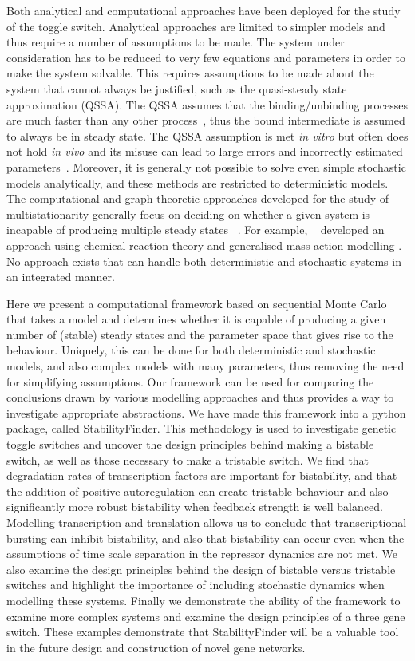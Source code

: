 Both analytical and computational approaches have been deployed for the study of the toggle switch. Analytical approaches are limited to simpler models and thus require a number of assumptions to be made. The system under consideration has to be reduced to very few equations and parameters in order to make the system solvable. This requires assumptions to be made about the system that cannot always be justified, such as the quasi-steady state approximation (QSSA). The QSSA assumes that the binding/unbinding processes are much faster than any other process~\autocite{Loinger:2007vma}, thus the bound intermediate is assumed to always be in steady state. The QSSA assumption is met \textit{in vitro} but often does not hold \textit{in vivo} and its misuse can lead to large errors and incorrectly estimated parameters~\autocite{Pedersen:2007ke}. Moreover, it is generally not possible to solve even simple stochastic models analytically, and these methods are restricted to deterministic models. The computational and graph-theoretic approaches developed for the study of multistationarity generally focus on deciding on whether a given system is incapable of producing multiple steady states ~\autocite{Conradi:2007jo, Banaji:2010fh,Feliu:2013dz}. For example, ~\textcite{Feliu:2013dz} developed an approach using chemical reaction theory and generalised mass action modelling \autocite{Feliu:2013dz}. No approach exists that can handle both deterministic and stochastic systems in an integrated manner.
\par
Here we present a computational framework based on sequential Monte Carlo that takes a model and determines whether it is capable of producing a given number of (stable) steady states and the parameter space that gives rise to the behaviour. Uniquely, this can be done for both deterministic and stochastic models, and also complex models with many parameters, thus removing the need for simplifying assumptions. Our framework can be used for comparing the conclusions drawn by various modelling approaches and thus provides a way to investigate appropriate abstractions. We have made this framework into a python package, called StabilityFinder. This methodology is used to investigate genetic toggle switches and uncover the design principles behind making a bistable switch, as well as those necessary to make a tristable switch. We find that degradation rates of transcription factors are important for bistability, and that the addition of positive autoregulation can create tristable behaviour and also significantly more robust bistability when feedback strength is well balanced. Modelling transcription and translation allows us to conclude that transcriptional bursting can inhibit bistability, and also that bistability can occur even when the assumptions of time scale separation in the repressor dynamics are not met. We also examine the design principles behind the design of bistable versus tristable switches and highlight the importance of including stochastic dynamics when modelling these systems. Finally we demonstrate the ability of the framework to examine more complex systems and examine the design principles of a three gene switch. These examples demonstrate that StabilityFinder will be a valuable tool in the future design and construction of novel gene networks. 

